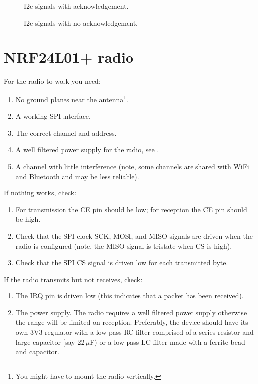 \begin{figure}[!h]
  \centering
  \caption{I2c signals with acknowledgement.}
\end{figure}


\begin{figure}[!h]
  \centering
  \caption{I2c signals with no acknowledgement.}
\end{figure}


\section{NRF24L01+ radio}
\label{nrf24l01-radio}

For the radio to work you need:

\begin{enumerate}
\item No ground planes near the antenna\footnote{You might have to
  mount the radio vertically.}.

\item A working SPI interface.

\item The correct channel and address.

\item A well filtered power supply for the radio, see .

\item A channel with little interference (note, some channels are
  shared with WiFi and Bluetooth and may be less reliable).
\end{enumerate}

If nothing works, check:

\begin{enumerate}
\item
  For transmission the CE pin should be low; for reception the CE pin
  should be high.
\item
  Check that the SPI clock SCK, MOSI, and MISO signals are driven when
  the radio is configured (note, the MISO signal is tristate when CS is
  high).
\item
  Check that the SPI CS signal is driven low for each transmitted byte.
\end{enumerate}

If the radio transmits but not receives, check:

\begin{enumerate}
\item
  The IRQ pin is driven low (this indicates that a packet has been
  received).
\item
  The power supply. The radio requires a well filtered power supply
  otherwise the range will be limited on reception. Preferably, the
  device should have its own 3V3 regulator with a low-pass RC filter
  comprised of a series resistor and large capacitor (say 22\,$\mu$F)
  or a low-pass LC filter made with a ferrite bead and capacitor.
\end{enumerate}


